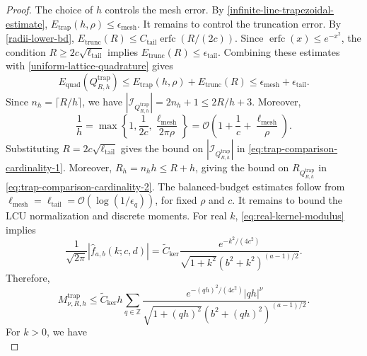 \documentclass[10pt,a4paper]{amsart}
\begin{document}
\begin{proof}
The choice of \(h\) controls the mesh error. By \cref{infinite-line-trapezoidal-estimate}, \(E_{\operatorname{trap}}(h,\rho)\le \epsilon_{\operatorname{mesh}}\). It remains to control the truncation error. By \cref{radii-lower-bd}, \(E_{\operatorname{trunc}}(R)\le C_{\operatorname{tail}}\operatorname{erfc}(R/(2c))\). Since \(\operatorname{erfc}(x)\le e^{-x^2}\), the condition \(R\ge 2c\sqrt{\ell_{\operatorname{tail}}}\) implies \(E_{\operatorname{trunc}}(R)\le \epsilon_{\operatorname{tail}}\). Combining these estimates with \cref{uniform-lattice-quadrature} gives
\begin{equation}
E_{\operatorname{quad}}(Q_{R,h}^{\operatorname{trap}})\le E_{\operatorname{trap}}(h,\rho)+E_{\operatorname{trunc}}(R)\le \epsilon_{\operatorname{mesh}}+\epsilon_{\operatorname{tail}}.
\end{equation}
Since \(n_h=\lceil R/h\rceil\), we have \(|\mathcal I_{Q_{R,h}^{\operatorname{trap}}}|=2n_h+1\le 2R/h+3\). Moreover,
\begin{equation}
\frac1h = \max\left\{1,\frac1{2c},\frac{\ell_{\operatorname{mesh}}}{2\pi\rho}\right\} = \mathcal O\left(1+\frac1c+\frac{\ell_{\operatorname{mesh}}}{\rho}\right).
\end{equation}
Substituting \(R=2c\sqrt{\ell_{\operatorname{tail}}}\) gives the bound on \(|\mathcal I_{Q_{R,h}^{\operatorname{trap}}}|\) in \cref{eq:trap-comparison-cardinality-1}. Moreover, \(R_h=n_hh\le R+h\), giving the bound on \(R_{Q_{R,h}^{\operatorname{trap}}}\) in \cref{eq:trap-comparison-cardinality-2}. The balanced-budget estimates follow from \(\ell_{\operatorname{mesh}}=\ell_{\operatorname{tail}}=\mathcal O(\log(1/\epsilon_q))\), for fixed \(\rho\) and \(c\). It remains to bound the LCU normalization and discrete moments. For real \(k\), \cref{eq:real-kernel-modulus} implies
\begin{equation}\label{eq:kernel-sharp-majorant}
\frac{1}{\sqrt{2\pi}}|\hat f_{a,b}(k;c,d)| = \widetilde C_{\operatorname{ker}}\frac{e^{-k^2/(4c^2)}}{\sqrt{1+k^2}(b^2+k^2)^{(a-1)/2}}.
\end{equation}
Therefore,
\begin{equation}\label{eq:trap-moment-sharp-start}
M_{\nu,R,h}^{\operatorname{trap}}\le \widetilde C_{\operatorname{ker}}h\sum_{q\in\mathbb Z}\frac{e^{-(qh)^2/(4c^2)}|qh|^\nu}{\sqrt{1+(qh)^2}(b^2+(qh)^2)^{(a-1)/2}}.
\end{equation}
For \(k>0\), we have
\begin{equation}\label{eq:trap-denom-min-bound}

\end{equation}
\end{proof}
\end{document}
